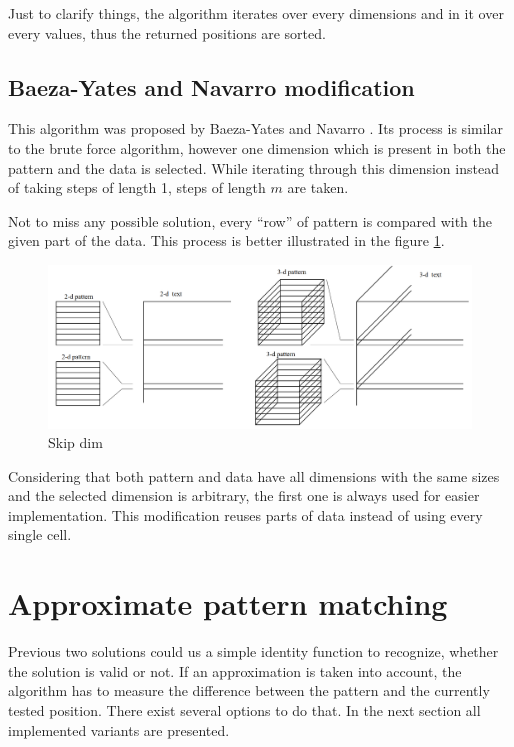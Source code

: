 Just to clarify things, the algorithm iterates over every dimensions and in it over every values, thus the returned positions are sorted.

\subsection{Baeza-Yates and Navarro modification}
This algorithm was proposed by Baeza-Yates and Navarro \cite{mdApproxPM}. Its process is similar to the brute force algorithm, however one dimension which is present in both the pattern and the data is selected. While iterating through this dimension instead of taking steps of length 1, steps of length $m$ are taken.

Not to miss any possible solution, every ``row'' of pattern is compared with the given part of the data. This process is better illustrated in the figure \ref{fig_skipDim}.

\begin{figure}
\centering
\includegraphics[width=\textwidth]{skipDim}
\caption{Skip dim}
\label{fig_skipDim}
\end{figure}

Considering that both pattern and data have all dimensions with the same sizes and the selected dimension is arbitrary, the first one is always used for easier implementation. This modification reuses parts of data instead of using every single cell.

\section{Approximate pattern matching}
Previous two solutions could us a simple identity function to recognize, whether the solution is valid or not. If an approximation is taken into account, the algorithm has to measure the difference between the pattern and the currently tested position. There exist several options to do that. In the next section all implemented variants are presented.

